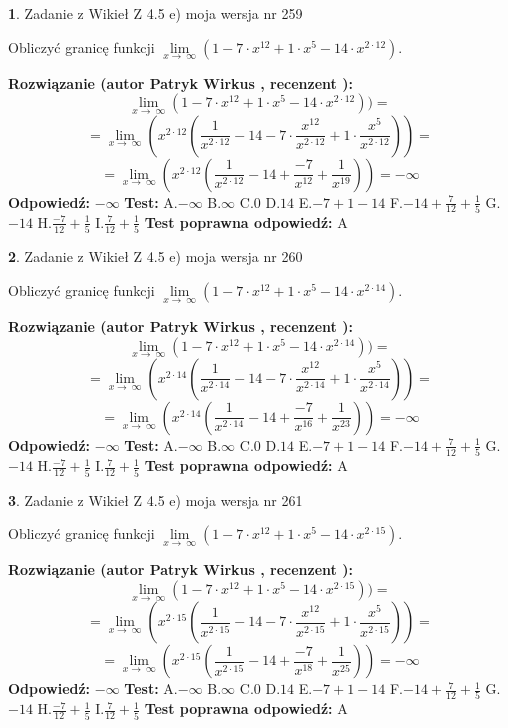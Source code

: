\documentclass[12pt, a4paper]{article}
\theoremstyle{definition} %
\newtheorem{zad}{}
\newcommand{\zadStart}[1]{\begin{zad}#1\newline}
\newcommand{\zadStop}{\end{zad}}
\newcommand{\rozwStart}[2]{\noindent \textbf{Rozwiązanie (autor #1 , recenzent #2): }\newline}
\newcommand{\rozwStop}{\newline}
\newcommand{\odpStart}{\noindent \textbf{Odpowiedź:}\newline}
\newcommand{\odpStop}{\newline}
\newcommand{\testStart}{\noindent \textbf{Test:}\newline}
\newcommand{\testStop}{\newline}
\newcommand{\kluczStart}{\noindent \textbf{Test poprawna odpowiedź:}\newline}
\newcommand{\kluczStop}{\newline}
\begin{document}
\zadStart{Zadanie z Wikieł Z 4.5 e) moja wersja nr 259}



Obliczyć granicę funkcji  $\lim\limits_{x\to\ \infty}(1 - 7 \cdot x^{12}+1 \cdot x^{5}- 14 \cdot x^{2\cdot12})$.
\zadStop
\rozwStart{Patryk Wirkus}{}
$$\lim\limits_{x\to\ \infty}(1 - 7 \cdot x^{12}+1 \cdot x^{5}- 14 \cdot x^{2\cdot12}))=$$
$$=\lim\limits_{x\to\ \infty}(x^{2\cdot12}(\frac{1}{x^{2\cdot12}}-14 -7 \cdot \frac{x^{12}}{x^{2\cdot12}}+1 \cdot \frac{x^{5}}{x^{2\cdot12}}))=$$
$$=\lim\limits_{x\to\ \infty}(x^{2\cdot12}(\frac{1}{x^{2\cdot12}}-14 + \frac{-7}{x^{12}}+ \frac{1}{x^{19}}))=-\infty$$
\rozwStop
\odpStart
$-\infty$
\odpStop
\testStart
A.$-\infty$ B.$\infty$ C.$0$ D.$14$ E.$-7 + 1 - 14$
F.$-14+\frac{7}{12}+\frac{1}{5}$ G.$-14$
H.$\frac{-7}{12}+\frac{1}{5}$
I.$\frac{7}{12}+\frac{1}{5}$
\testStop
\kluczStart
A
\kluczStop



\zadStart{Zadanie z Wikieł Z 4.5 e) moja wersja nr 260}



Obliczyć granicę funkcji  $\lim\limits_{x\to\ \infty}(1 - 7 \cdot x^{12}+1 \cdot x^{5}- 14 \cdot x^{2\cdot14})$.
\zadStop
\rozwStart{Patryk Wirkus}{}
$$\lim\limits_{x\to\ \infty}(1 - 7 \cdot x^{12}+1 \cdot x^{5}- 14 \cdot x^{2\cdot14}))=$$
$$=\lim\limits_{x\to\ \infty}(x^{2\cdot14}(\frac{1}{x^{2\cdot14}}-14 -7 \cdot \frac{x^{12}}{x^{2\cdot14}}+1 \cdot \frac{x^{5}}{x^{2\cdot14}}))=$$
$$=\lim\limits_{x\to\ \infty}(x^{2\cdot14}(\frac{1}{x^{2\cdot14}}-14 + \frac{-7}{x^{16}}+ \frac{1}{x^{23}}))=-\infty$$
\rozwStop
\odpStart
$-\infty$
\odpStop
\testStart
A.$-\infty$ B.$\infty$ C.$0$ D.$14$ E.$-7 + 1 - 14$
F.$-14+\frac{7}{12}+\frac{1}{5}$ G.$-14$
H.$\frac{-7}{12}+\frac{1}{5}$
I.$\frac{7}{12}+\frac{1}{5}$
\testStop
\kluczStart
A
\kluczStop



\zadStart{Zadanie z Wikieł Z 4.5 e) moja wersja nr 261}



Obliczyć granicę funkcji  $\lim\limits_{x\to\ \infty}(1 - 7 \cdot x^{12}+1 \cdot x^{5}- 14 \cdot x^{2\cdot15})$.
\zadStop
\rozwStart{Patryk Wirkus}{}
$$\lim\limits_{x\to\ \infty}(1 - 7 \cdot x^{12}+1 \cdot x^{5}- 14 \cdot x^{2\cdot15}))=$$
$$=\lim\limits_{x\to\ \infty}(x^{2\cdot15}(\frac{1}{x^{2\cdot15}}-14 -7 \cdot \frac{x^{12}}{x^{2\cdot15}}+1 \cdot \frac{x^{5}}{x^{2\cdot15}}))=$$
$$=\lim\limits_{x\to\ \infty}(x^{2\cdot15}(\frac{1}{x^{2\cdot15}}-14 + \frac{-7}{x^{18}}+ \frac{1}{x^{25}}))=-\infty$$
\rozwStop
\odpStart
$-\infty$
\odpStop
\testStart
A.$-\infty$ B.$\infty$ C.$0$ D.$14$ E.$-7 + 1 - 14$
F.$-14+\frac{7}{12}+\frac{1}{5}$ G.$-14$
H.$\frac{-7}{12}+\frac{1}{5}$
I.$\frac{7}{12}+\frac{1}{5}$
\testStop
\kluczStart
A
\kluczStop
\end{document}
